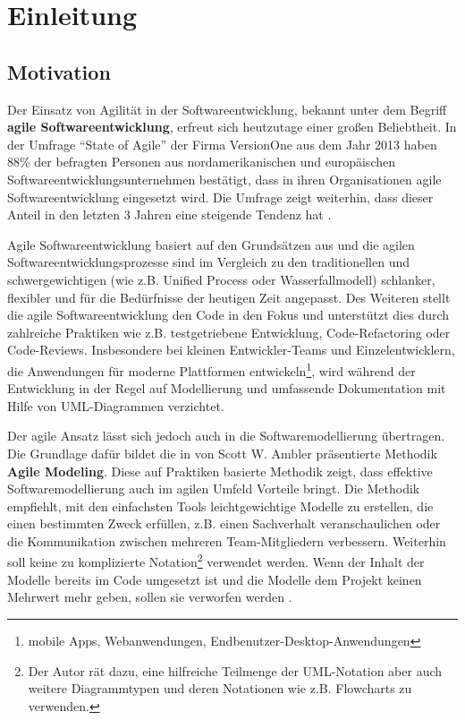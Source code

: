
\chapter{Einleitung}
\label{chapter:introduction}

\section{Motivation}

Der Einsatz von Agilität in der Softwareentwicklung, bekannt unter dem Begriff \textbf{agile Softwareentwicklung}, erfreut sich heutzutage einer großen Beliebtheit. In der Umfrage \enquote{State of Agile} der Firma VersionOne aus dem Jahr 2013 haben 88\% der befragten Personen aus nordamerikanischen und europäischen Softwareentwicklungsunternehmen bestätigt, dass in ihren Organisationen agile Softwareentwicklung eingesetzt wird. Die Umfrage zeigt weiterhin, dass dieser Anteil in den letzten 3 Jahren eine steigende Tendenz hat \cite{VersionOne148th-Annual}.

Agile Softwareentwicklung basiert auf den Grundsätzen aus \cite{BeckBeedle01Manifest} und die agilen Softwareentwicklungsprozesse sind im Vergleich zu den traditionellen und schwergewichtigen (wie z.B. Unified Process oder Wasserfallmodell) schlanker, flexibler und für die Bedürfnisse der heutigen Zeit angepasst. Des Weiteren stellt die agile Softwareentwicklung den Code in den Fokus und unterstützt dies durch zahlreiche Praktiken wie z.B. testgetriebene Entwicklung, Code-Refactoring oder Code-Reviews. Insbesondere bei kleinen Entwickler-Teams und Einzelentwicklern, die Anwendungen für moderne Plattformen entwickeln\footnote{mobile Apps, Webanwendungen, Endbenutzer-Desktop-Anwendungen}, wird während der Entwicklung in der Regel auf Modellierung und umfassende Dokumentation mit Hilfe von UML-Dia\-gram\-men verzichtet.

Der agile Ansatz lässt sich jedoch auch in die Softwaremodellierung übertragen. Die Grundlage dafür bildet die in \cite{Ambler02Agile} von Scott W. Ambler präsentierte Methodik \textbf{Agile Modeling}. Diese auf Praktiken basierte Methodik zeigt, dass effektive Softwaremodellierung auch im agilen Umfeld Vorteile bringt. Die Methodik empfiehlt, mit den einfachsten Tools leichtgewichtige Modelle zu erstellen, die einen bestimmten Zweck erfüllen, z.B. einen Sachverhalt  veranschaulichen oder die Kommunikation zwischen mehreren Team-Mitgliedern verbessern. Weiterhin soll keine zu komplizierte Notation\footnote{Der Autor rät dazu, eine hilfreiche Teilmenge der UML-Notation aber auch weitere Diagrammtypen und deren Notationen wie z.B. Flowcharts zu verwenden.} verwendet werden. Wenn der Inhalt der Modelle bereits im Code umgesetzt ist und die Modelle dem Projekt keinen Mehrwert mehr geben, sollen sie verworfen werden \cite{Ambler02Agile}.

